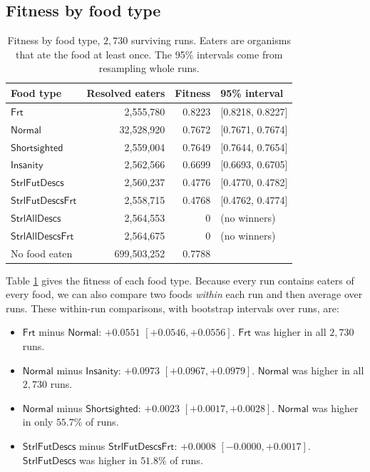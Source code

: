\documentclass{article}
\begin{document}
\subsection{Fitness by food type}

\begin{table}[ht]
    \centering
    \caption{Fitness by food type, $2{,}730$ surviving runs. Eaters are
    organisms that ate the food at least once. The 95\% intervals come from
    resampling whole runs.}
    \label{tab:fitness-by-food}
    \begin{tabular}{lrrl}
        \hline
        Food type & Resolved eaters & Fitness & 95\% interval \\
        \hline
        $\mathsf{Frt}$ & 2,555,780 & 0.8223 & [0.8218, 0.8227] \\
        $\mathsf{Normal}$ & 32,528,920 & 0.7672 & [0.7671, 0.7674] \\
        $\mathsf{Shortsighted}$ & 2,559,004 & 0.7649 & [0.7644, 0.7654] \\
        $\mathsf{Insanity}$ & 2,562,566 & 0.6699 & [0.6693, 0.6705] \\
        $\mathsf{StrlFutDescs}$ & 2,560,237 & 0.4776 & [0.4770, 0.4782] \\
        $\mathsf{StrlFutDescsFrt}$ & 2,558,715 & 0.4768 & [0.4762, 0.4774] \\
        $\mathsf{StrlAllDescs}$ & 2,564,553 & 0 & (no winners) \\
        $\mathsf{StrlAllDescsFrt}$ & 2,564,675 & 0 & (no winners) \\
        \hline
        No food eaten & 699,503,252 & 0.7788 & \\
        \hline
    \end{tabular}
\end{table}

Table \ref{tab:fitness-by-food} gives the fitness of each food type. Because
every run contains eaters of every food, we can also compare two foods
\emph{within} each run and then average over runs. These within-run
comparisons, with bootstrap intervals over runs, are:
\begin{itemize}
    \item $\mathsf{Frt}$ minus $\mathsf{Normal}$: $+0.0551$ $[+0.0546, +0.0556]$.
        $\mathsf{Frt}$ was higher in all $2{,}730$ runs.
    \item $\mathsf{Normal}$ minus $\mathsf{Insanity}$: $+0.0973$ $[+0.0967, +0.0979]$.
        $\mathsf{Normal}$ was higher in all $2{,}730$ runs.
    \item $\mathsf{Normal}$ minus $\mathsf{Shortsighted}$: $+0.0023$ $[+0.0017, +0.0028]$.
        $\mathsf{Normal}$ was higher in only $55.7\%$ of runs.
    \item $\mathsf{StrlFutDescs}$ minus $\mathsf{StrlFutDescsFrt}$: $+0.0008$
        $[-0.0000, +0.0017]$. $\mathsf{StrlFutDescs}$ was higher in $51.8\%$ of runs.
\end{itemize}
\end{document}
